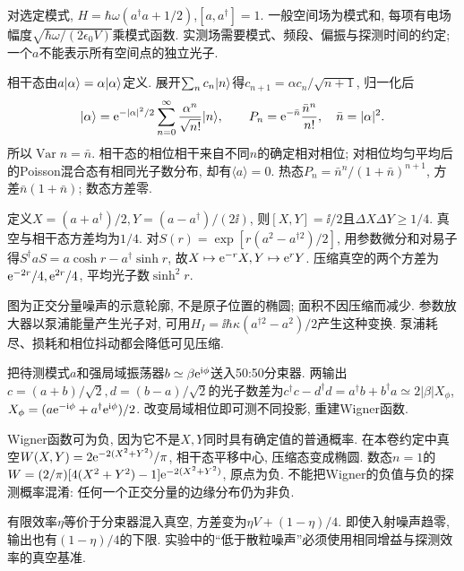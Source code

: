 对选定模式, $H=\hbar\omega(a^\dagger a+1/2)$,$[a,a^\dagger]=1$. 一般空间场为模式和, 每项有电场幅度$\sqrt{\hbar\omega/(2\epsilon_0V)}$乘模式函数. 实测场需要模式、频段、偏振与探测时间的约定; 一个$a$不能表示所有空间点的独立光子.

相干态由$a\lvert \alpha\rangle=\alpha\lvert \alpha\rangle$定义. 展开$\sum_nc_n\lvert n\rangle$得$c_{n+1}=\alpha c_n/\sqrt{n+1}$, 归一化后
\[\lvert \alpha\rangle=\mathrm e^{-|\alpha|^2/2}\sum_{n=0}^{\infty}\frac{\alpha^n}{\sqrt{n!}}\lvert n\rangle,\qquad P_n=\mathrm e^{-\bar n}\frac{\bar n^n}{n!},\quad\bar n=|\alpha|^2.\]
所以$\operatorname{Var}n=\bar n$. 相干态的相位相干来自不同$n$的确定相对相位; 对相位均匀平均后的Poisson混合态有相同光子数分布, 却有$\langle a\rangle=0$. 热态$P_n=\bar n^n/(1+\bar n)^{n+1}$, 方差$\bar n(1+\bar n)$; 数态方差零.

定义$X=(a+a^\dagger)/2,Y=(a-a^\dagger)/(2\ii)$, 则$[X,Y]=\ii/2$且$\Delta X\Delta Y\ge1/4$. 真空与相干态方差均为$1/4$. 对$S(r)=\exp[r(a^2-a^{\dagger2})/2]$, 用参数微分和对易子得$S^\dagger aS=a\cosh r-a^\dagger\sinh r$, 故$X\mapsto\mathrm e^{-r}X,Y\mapsto\mathrm e^rY$. 压缩真空的两个方差为$\mathrm e^{-2r}/4,\mathrm e^{2r}/4$, 平均光子数$\sinh^2r$.

\begin{center}\end{center}
图为正交分量噪声的示意轮廓, 不是原子位置的椭圆; 面积不因压缩而减少. 参数放大器以泵浦能量产生光子对, 可用$H_I=\ii\hbar\kappa(a^{\dagger2}-a^2)/2$产生这种变换. 泵浦耗尽、损耗和相位抖动都会降低可见压缩.

把待测模式$a$和强局域振荡器$b\simeq\beta\mathrm e^{\mathrm i\phi}$送入50:50分束器. 两输出$c=(a+b)/\sqrt2,d=(b-a)/\sqrt2$的光子数差为$c^\dagger c-d^\dagger d=a^\dagger b+b^\dagger a\simeq2|\beta|X_\phi$, $X_\phi=(a\mathrm e^{-\mathrm i\phi}+a^\dagger\mathrm e^{\mathrm i\phi})/2$. 改变局域相位即可测不同投影, 重建Wigner函数.

Wigner函数可为负, 因为它不是$X,Y$同时具有确定值的普通概率. 在本卷约定中真空$W(X,Y)=2\mathrm e^{-2(X^2+Y^2)}/\pi$, 相干态平移中心, 压缩态变成椭圆. 数态$n=1$的$W=(2/\pi)[4(X^2+Y^2)-1]\mathrm e^{-2(X^2+Y^2)}$, 原点为负. 不能把Wigner的负值与负的探测概率混淆: 任何一个正交分量的边缘分布仍为非负.

有限效率$\eta$等价于分束器混入真空, 方差变为$\eta V+(1-\eta)/4$. 即使入射噪声趋零, 输出也有$(1-\eta)/4$的下限. 实验中的“低于散粒噪声”必须使用相同增益与探测效率的真空基准.
